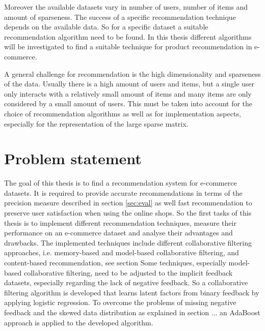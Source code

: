 \documentclass[10pt]{reportMaster}
\begin{document}
Moreover the available datasets vary in number of users, number of items and amount of sparseness.
The success of a specific recommendation technique depends on the available data.
So for a specific dataset a suitable recommendation algorithm need to be found. %
In this thesis different algorithms will be investigated to find a suitable technique for product recommendation in e-commerce.

A general challenge for recommendation is the high dimensionality and sparseness of the data.
Usually there is a high amount of users and items, but a single user only interacts with a relatively small amount of items and many items are only considered by a small amount of users.
This must be taken into account for the choice of recommendation algorithms as well as for implementation aspects, especially for the representation of the large sparse matrix. %



\section{Problem statement}
The goal of this thesis is to find a recommendation system for e-commerce datasets.
It is required to provide accurate recommendations in terms of the precision measure described in section \ref{sec:eval} as well fast recommendation to preserve user satisfaction when using the online shops.
So the first tasks of this thesis is to implement different recommendation techniques, measure their performance on an e-commerce dataset and analyse their advantages and drawbacks.
The implemented techniques include different collaborative filtering approaches, i.e. memory-based and model-based collaborative filtering, and content-based recommendation, see section %
Some techniques, especially model-based collaborative filtering, need to be adjusted to the implicit feedback datasets, especially regarding the lack of negative feedback.
So a collaborative filtering algorithm is developed that learns latent factors from binary feedback by applying logistic regression.
To overcome the problems of missing negative feedback and the skewed data distribution as explained in section ... an AdaBoost approach is applied to the developed algorithm. %
\end{document}
